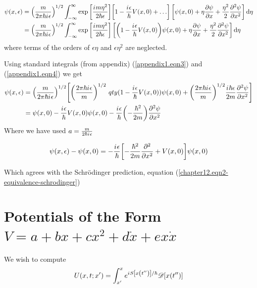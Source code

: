 	\begin{align}
		\psi\qty(x, \epsilon) 
		&= \qty(\frac{m}{2\pi \hbar {i\mkern1mu} \epsilon})^{1/2} \int_{-\infty}^{\infty} \exp\qty[\frac{{i\mkern1mu} m \eta^2}{2\hbar \epsilon}]  \qty[1 - \frac{{i\mkern1mu} \epsilon}{\hbar} V(x, 0)+ \ldots] \left[\psi\qty(x, 0) + \eta \pdv{\psi}{x} + \frac{\eta^2}{2} \pdv[2]{\psi}{x}\right] \dd{\eta}\\
		&= \qty(\frac{m}{2\pi \hbar {i\mkern1mu} \epsilon})^{1/2} \int_{-\infty}^{\infty} \exp\qty[\frac{{i\mkern1mu} m \eta^2}{2\hbar \epsilon}] \left[\qty(1 - \frac{{i\mkern1mu} \epsilon}{\hbar} V(x, 0))\psi\qty(x, 0) + \eta \pdv{\psi}{x} + \frac{\eta^2}{2} \pdv[2]{\psi}{x} \right] \dd{\eta}
	\end{align}
	where terms of the orders of $\epsilon \eta$ and $\epsilon \eta^2$ are neglected.
	
	Using standard integrals (from appendix) (\ref{appendix1.eqn3}) and (\ref{appendix1.eqn4}) we get
	\begin{align*}
		\psi\qty(x, \epsilon) 
		&= \qty(\frac{m}{2\pi \hbar {i\mkern1mu} \epsilon})^{1/2} \qty[\qty(\frac{2\pi \hbar {i\mkern1mu} \epsilon}{m})^{1/2}\  qty(1 - \frac{{i\mkern1mu} \epsilon}{\hbar} V\qty(x , 0))\psi\qty(x,0)  +  \qty(\frac{2\pi \hbar {i\mkern1mu} \epsilon}{m})^{1/2} \frac{{i\mkern1mu} \hbar \epsilon}{2 m} \pdv[2]{\psi}{x}] \\
		&= \psi\qty(x, 0) - \frac{{i\mkern1mu} \epsilon}{\hbar} V\qty(x, 0) \psi\qty(x, 0) - \frac{{i\mkern1mu} \epsilon}{\hbar} \qty(- \frac{\hbar^2}{2 m}) \pdv[2]{\psi}{x}
	\end{align*}
	Where we have used $a = \frac{m}{2\hbar{i\mkern1mu} \epsilon}$
	
	\begin{equation}
		\psi\qty(x, \epsilon) - \psi\qty(x, 0) = -\frac{{i\mkern1mu} \epsilon}{\hbar} \qty[-\frac{\hbar^2}{2 m} \pdv[2]{x} + V\qty(x,0)] \psi\qty(x, 0)
		\label{chapter12.eqn9-equivalence-schrodinger}
	\end{equation}
	
	Which agrees with the Schr\"{o}dinger prediction, equation (\ref{chapter12.eqn2-equivalence-schrodinger})


	\section{Potentials of the Form $V=a+b x+ c x^2 + d \dot{x} + e x \dot{x}$}
	We wish to compute
	\begin{equation}
		U\qty(x, t; x^\prime) = \int_{x^\prime}^{x} e^{{i\mkern1mu} S\qty[x\qty(t^{\prime\prime})] / \hbar}  \mathcal{D}\qty[x\qty(t^{\prime\prime})]
		\label{chapter12.eqn1-potential}
	\end{equation}
	

